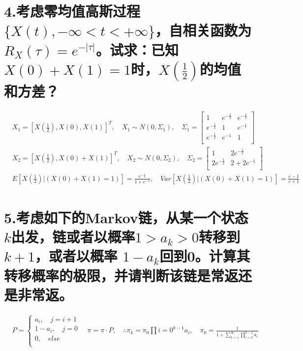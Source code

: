 \documentclass[UTF8]{ctexart}
\begin{document}
\section*{4.考虑零均值高斯过程$\{X(t),-\infty<t<+\infty\}$，自相关函数为$R_X(\tau)=e^
  {-\lvert\tau\rvert}$。试求：已知$X(0)+X(1)=1$时，$X(\frac{1}{2})$的均值和方差？}
\begin{equation*}
  \begin{aligned}
     & X_1=[X(\frac{1}{2}),X(0),X(1)]^T,\quad X_1\sim N(0,\Sigma_1),\quad\Sigma_1=
    \begin{bmatrix}
      1                & e^{-\frac{1}{2}} & e^{-\frac{1}{2}} \\
      e^{-\frac{1}{2}} & 1                & e^{-1}           \\
      e^{-\frac{1}{2}} & e^{-1}           & 1                \\
    \end{bmatrix}                                                        \\
     & X_2=[X(\frac{1}{2}),X(0)+X(1)]^T,\quad X_2\sim N(0,\Sigma_2),\quad\Sigma_2=
    \begin{bmatrix}
      1                 & 2e^{-\frac{1}{2}} \\
      2e^{-\frac{1}{2}} & 2+2e^{-1}         \\
    \end{bmatrix}                                                        \\
     & E[X(\frac{1}{2})\lvert (X(0)+X(1)=1)]=\frac{e^{-\frac{1}{2}}}{1+e^{-1}},\quad
    Var[X(\frac{1}{2})\lvert (X(0)+X(1)=1)]=\frac{e-1}{e+1}                          \\
  \end{aligned}
\end{equation*}
\section*{5.考虑如下的Markov链，从某一个状态$k$出发，链或者以概率$1>a_k>0$转移到$k+1$，或者以概率
  $1-a_k$回到0。计算其转移概率的极限，并请判断该链是常返还是非常返。}
\begin{equation*}
  \begin{aligned}
     & P=\begin{cases}
      a_i,\quad j=i+1 \\
      1-a_i,\quad j=0 \\
      0,\quad else    \\
    \end{cases}\quad
    \pi=\pi\cdot P,\quad\therefore\pi_k=\pi_0\prod\limits{i=0}^{k-1}a_i,\quad
    \pi_0=\frac{1}{1+\sum\limits_{k=1}^\infty\prod\limits_{i=0}^{k-1}a_i}
  \end{aligned}
\end{equation*}
\end{document}
